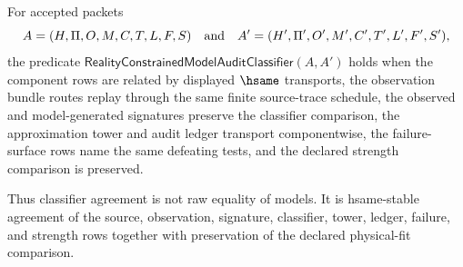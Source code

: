 \begin{definition}
\label{def:reality-constrained-model-audit-classifier}
For accepted packets
$$
A=(H,\Pi,O,M,C,T,L,F,S)
\quad\hbox{and}\quad
A'=(H',\Pi',O',M',C',T',L',F',S'),
$$
the predicate $\mathsf{RealityConstrainedModelAuditClassifier}(A,A')$ holds when the component rows are related by displayed $\hsame$ transports, the observation bundle routes replay through the same finite source-trace schedule, the observed and model-generated signatures preserve the classifier comparison, the approximation tower and audit ledger transport componentwise, the failure-surface rows name the same defeating tests, and the declared strength comparison is preserved.

Thus classifier agreement is not raw equality of models. It is hsame-stable agreement of the source, observation, signature, classifier, tower, ledger, failure, and strength rows together with preservation of the declared physical-fit comparison.
\end{definition}

